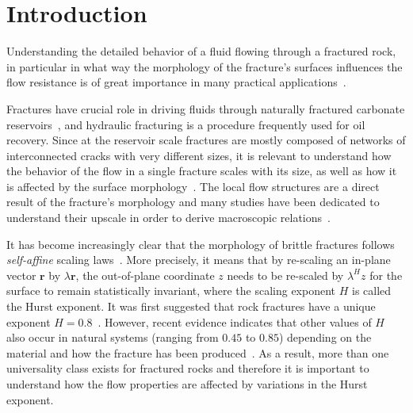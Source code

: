 \documentclass[aps,pre,
superscriptaddress,
twocolumn,
notitlepage,
10pt,]{revtex4-1}
\begin{document}
\maketitle

\section{Introduction}


Understanding the detailed behavior of a fluid flowing through a fractured rock,
in particular in what way the morphology of the fracture's surfaces influences
the flow resistance is of great importance in many practical
applications~\cite{Sahimi1993, Berkowitz2002, Sahimi2011, Osborn2011,
	Williams2017}.

Fractures have crucial role in driving fluids through naturally fractured
carbonate reservoirs~\cite{Warren1963, Liu2016a}, and hydraulic fracturing
\cite{HUBBERT1957, Rubinstein2015} is a procedure frequently used for oil
recovery. Since at the reservoir scale fractures are mostly composed of networks
of interconnected cracks with very different sizes, it is relevant to understand
how the behavior of the flow in a single fracture scales with its size, as well
as how it is affected by the surface morphology~\cite{Liu2016a}. The local flow
structures are a direct result of the fracture's morphology and many studies
have been dedicated to understand their upscale in order to derive macroscopic
relations~\cite{Roux1993, Talon2010, Talon2010a, Wang2016}.


It has become increasingly clear that the morphology of brittle fractures
follows \emph{self-affine} scaling laws~\cite{Bunde1996}. More precisely, it
means that by re-scaling an in-plane vector $\mathbf{r}$ by $\lambda
\mathbf{r}$, the out-of-plane coordinate $z$ needs to be re-scaled by
$\lambda^{H} z$ for the surface to remain statistically invariant, where the
scaling exponent $H$ is called the Hurst exponent.
%
It was first suggested that rock fractures have a unique exponent
$H=0.8$~\cite{Bouchaud1990, Maaloey1992, Schmittbuhl1993,
	Cox1993,Schmittbuhl1995,Bouchaud1997, Oron1998}. However, recent evidence
indicates that other values of $H$ also occur in natural systems (ranging from
$0.45$ to $0.85$) depending  on the material and how the fracture has been
produced~\cite{Odling1994,Amitrano2002, Ponson2006, Babadagli2015}. As a result,
more than one universality class exists for fractured rocks and therefore it is
important to understand how the flow properties are affected by variations in
the Hurst exponent.
\end{document}
